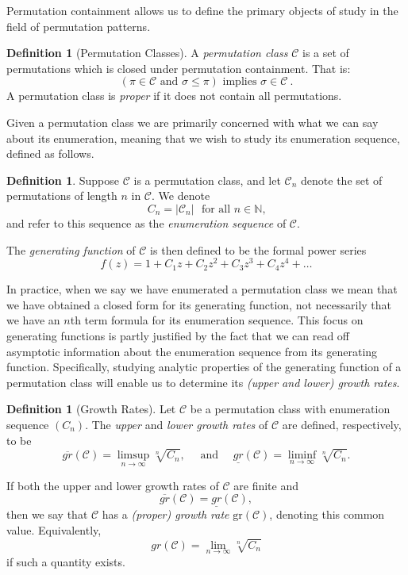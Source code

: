 \documentclass[11pt,a4paper]{article}
\theoremstyle{definition}
\newtheorem{defn}[thm]{Definition}
\newcommand{\CCC}{\mathcal{C}}
\let\C\CCC
\newcommand{\gr}{\mathrm{gr}}
\begin{document}
Permutation containment allows us to define the primary objects of study in the field of permutation patterns.

\begin{defn}[Permutation Classes]
A \emph{permutation class} $\mathcal{C}$ is a set of permutations which is closed under permutation containment. That is:
\[
\left(\pi \in \C\text{ and }\sigma\leq \pi\right)\text{ implies }\sigma\in \C \ .
\]
A permutation class is \emph{proper} if it does not contain all permutations.
\end{defn}

Given a permutation class we are primarily concerned with what we can say about its enumeration, meaning that we wish to study its enumeration sequence, defined as follows.

\begin{defn} \label{enumseqforpermclass}
Suppose $\mathcal{C}$ is a permutation class, and let $\mathcal{C}_{n}$ denote the set of permutations of length $n$ in $\mathcal{C}$. We denote
\[
C_{n} = |\mathcal{C}_{n}| \ \ \ \text{for all $n \in \mathbb{N}$,}
\]
and refer to this sequence as the \emph{enumeration sequence} of $\mathcal{C}$.

The \emph{generating function} of $\mathcal{C}$ is then defined to be the formal power series
\[
f(z) = 1 + C_{1}z + C_{2}z^2 + C_{3}z^3 + C_{4}z^4 + \dots
\]
\end{defn}

In practice, when we say we have enumerated a permutation class we mean that we have obtained a closed form for its generating function, not necessarily that we have an $n$th term formula for its enumeration sequence. This focus on generating functions is partly justified by the fact that we can read off asymptotic information about the enumeration sequence from its generating function. Specifically, studying analytic properties of the generating function of a permutation class will enable us to determine its \emph{(upper and lower) growth rates}.

\begin{defn}[Growth Rates] \label{def:growthrates}
Let $\mathcal{C}$ be a permutation class with enumeration sequence $(C_{n})$. The \emph{upper} and \emph{lower growth rates} of $\mathcal{C}$ are defined, respectively, to be 
\[
\overline{gr}(\mathcal{C}) = \limsup_{n\to\infty}\sqrt[n]{C_n}, \quad\text{ and }\quad \underline{gr}(\mathcal{C})=\liminf_{n\to\infty}\sqrt[n]{C_n}.
\]

If both the upper and lower growth rates of $\mathcal{C}$ are finite and
\[
\overline{gr}(\mathcal{C})=\underline{gr}(\mathcal{C}),
\]
then we say that $\mathcal{C}$ has a \emph{(proper) growth rate} $\gr(\mathcal{C})$, denoting this common value. Equivalently,
\[
gr(\mathcal{C}) = \lim_{n \rightarrow \infty}\sqrt[n]{C_{n}}
\]
if such a quantity exists.
\end{defn}
\end{document}
